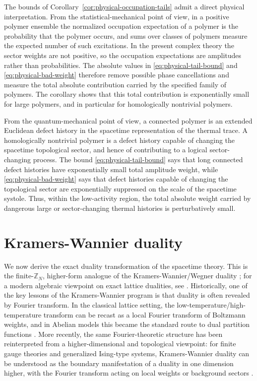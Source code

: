 The bounds of Corollary~\ref{cor:physical-occupation-tails} admit a direct physical
interpretation. From the statistical-mechanical point of view, in a positive polymer
ensemble the normalized occupation expectation of a polymer is the probability that the
polymer occurs, and sums over classes of polymers measure the expected number of such
excitations. In the present complex theory the sector weights are not positive, so the
occupation expectations are amplitudes rather than probabilities. The absolute values in
\eqref{eq:physical-tail-bound} and \eqref{eq:physical-bad-weight} therefore remove possible
phase cancellations and measure the total absolute contribution carried by the specified
family of polymers. The corollary shows that this total contribution is exponentially
small for large polymers, and in particular for homologically nontrivial polymers.

From the quantum-mechanical point of view, a connected polymer is an extended Euclidean
defect history in the spacetime representation of the thermal trace. A homologically
nontrivial polymer is a defect history capable of changing the spacetime topological
sector, and hence of contributing to a logical sector-changing process. The bound
\eqref{eq:physical-tail-bound} says that long connected defect histories have
exponentially small total amplitude weight, while \eqref{eq:physical-bad-weight} says
that defect histories capable of changing the topological sector are exponentially
suppressed on the scale of the spacetime systole. Thus, within the low-activity region,
the total absolute weight carried by dangerous large or sector-changing thermal histories
is perturbatively small.





\section{Kramers-Wannier duality}
\label{sec:KW-duality}

We now derive the exact duality transformation of the spacetime theory. This is the
finite-\(\mathbb Z_N\), higher-form analogue of the
Kramers-Wannier/Wegner duality
\cite{KramersWannier1941,Wegner:1971app,Savit1980,ElitzurPearsonShigemitsu1979}; for a
modern algebraic viewpoint on exact lattice dualities, see
\cite{CobaneraOrtizNussinov2011}. Historically, one of the key lessons of the
Kramers-Wannier program is that duality is often revealed by Fourier transform.
In the classical lattice setting, the low-temperature/high-temperature transform can be
recast as a local Fourier transform of Boltzmann weights, and in Abelian models this
became the standard route to dual partition functions
\cite{KramersWannier1941,Wegner:1971app,Savit1980}. More recently, the same Fourier-theoretic
structure has been reinterpreted from a higher-dimensional and topological viewpoint:
for finite gauge theories and generalized Ising-type systems, Kramers-Wannier duality can be
understood as the boundary manifestation of a duality in one dimension higher, with the
Fourier transform acting on local weights or background sectors
\cite{FreedTeleman2022,DelcampIshtiaque2024}.

